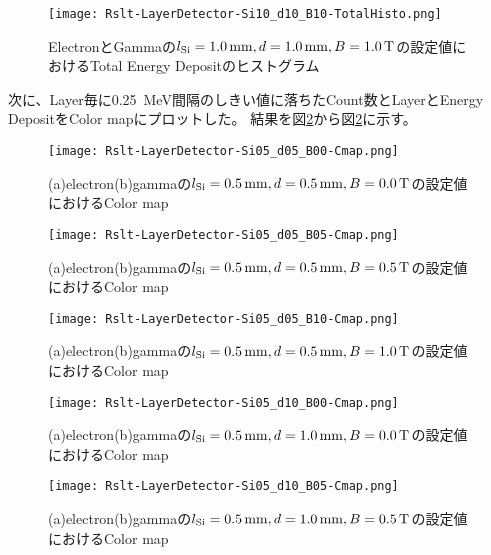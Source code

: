 \documentclass[a4paper,10pt]{jreport}
\begin{document}
\begin{figure}[H]
	\center
	\texttt{[image: Rslt-LayerDetector-Si10\_d10\_B10-TotalHisto.png]}
	\caption{ElectronとGammaの$l_{\rm{Si}}=\SI{1.0}{mm}, d=\SI{1.0}{mm}, B=\SI{1.0}{T}$の設定値におけるTotal Energy Depositのヒストグラム}
	\label{Rslt-LayerDetector-Si10_d10_B10-TotalHisto}
\end{figure}

次に、Layer毎に\SI{0.25}{MeV}間隔のしきい値に落ちたCount数とLayerとEnergy DepositをColor mapにプロットした。
結果を図\ref{Rslt-LayerDetector-Si05_d05_B00-Cmap}から図\ref{Rslt-LayerDetector-Si05_d05_B00-Cmap}に示す。

\begin{figure}[H]
	\center
	\texttt{[image: Rslt-LayerDetector-Si05\_d05\_B00-Cmap.png]}
	\caption{(a)electron(b)gammaの$l_{\rm{Si}}=\SI{0.5}{mm}, d=\SI{0.5}{mm}, B=\SI{0.0}{T}$の設定値におけるColor map}
	\label{Rslt-LayerDetector-Si05_d05_B00-Cmap}
\end{figure}

\begin{figure}[H]
	\center
	\texttt{[image: Rslt-LayerDetector-Si05\_d05\_B05-Cmap.png]}
	\caption{(a)electron(b)gammaの$l_{\rm{Si}}=\SI{0.5}{mm}, d=\SI{0.5}{mm}, B=\SI{0.5}{T}$の設定値におけるColor map}
	\label{Rslt-LayerDetector-Si05_d05_B05-Cmap}
\end{figure}

\begin{figure}[H]
	\center
	\texttt{[image: Rslt-LayerDetector-Si05\_d05\_B10-Cmap.png]}
	\caption{(a)electron(b)gammaの$l_{\rm{Si}}=\SI{0.5}{mm}, d=\SI{0.5}{mm}, B=\SI{1.0}{T}$の設定値におけるColor map}
	\label{Rslt-LayerDetector-Si05_d05_B10-Cmap}
\end{figure}

\begin{figure}[H]
	\center
	\texttt{[image: Rslt-LayerDetector-Si05\_d10\_B00-Cmap.png]}
	\caption{(a)electron(b)gammaの$l_{\rm{Si}}=\SI{0.5}{mm}, d=\SI{1.0}{mm}, B=\SI{0.0}{T}$の設定値におけるColor map}
	\label{Rslt-LayerDetector-Si05_d10_B00-Cmap}
\end{figure}

\begin{figure}[H]
	\center
	\texttt{[image: Rslt-LayerDetector-Si05\_d10\_B05-Cmap.png]}
	\caption{(a)electron(b)gammaの$l_{\rm{Si}}=\SI{0.5}{mm}, d=\SI{1.0}{mm}, B=\SI{0.5}{T}$の設定値におけるColor map}
	\label{Rslt-LayerDetector-Si05_d10_B05-Cmap}
\end{figure}
\end{document}

